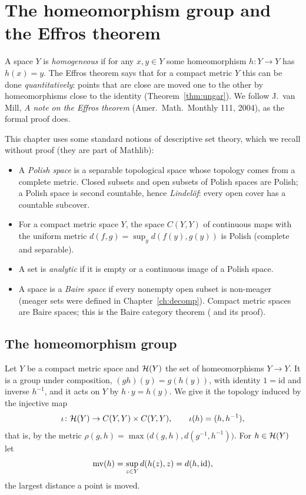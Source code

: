 \chapter{The homeomorphism group and the Effros theorem}\label{ch:effros}

A space $Y$ is \emph{homogeneous} if for any $x,y\in Y$ some homeomorphism $h\colon Y\to Y$ has
$h(x)=y$. The Effros theorem says that for a compact metric $Y$ this can be done
\emph{quantitatively}: points that are close are moved one to the other by homeomorphisms close to
the identity (Theorem~\ref{thm:ungar}). We follow J.~van Mill, \emph{A note on the Effros
theorem} (Amer.\ Math.\ Monthly 111, 2004), as the formal proof does.

This chapter uses some standard notions of descriptive set theory, which we recall without proof
(they are part of Mathlib):
\begin{itemize}
\item A \emph{Polish space} is a separable topological space whose topology comes from a complete
metric. Closed subsets and open subsets of Polish spaces are Polish; a Polish space is
second countable, hence \emph{Lindel\"of}: every open cover has a countable subcover.
\item For a compact metric space $Y$, the space $C(Y,Y)$ of continuous maps with the uniform metric
$d(f,g)=\sup_yd(f(y),g(y))$ is Polish (complete and separable).
\item A set is \emph{analytic} if it is empty or a continuous image of a Polish space.
\item A space is a \emph{Baire space} if every nonempty open subset is non-meager (meager sets were
defined in Chapter~\ref{ch:decomp}). Compact metric spaces are Baire spaces; this is the Baire
category theorem ( and its proof).
\end{itemize}

\section{The homeomorphism group}

Let $Y$ be a compact metric space and $\mathcal{H}(Y)$ the set of homeomorphisms $Y\to Y$. It is a group
under composition, $(gh)(y)=g(h(y))$, with identity $1=\mathrm{id}$ and inverse $h^{-1}$, and it acts on
$Y$ by $h\cdot y=h(y)$. We give it the topology induced by the injective map
\[
\iota\colon\mathcal{H}(Y)\to C(Y,Y)\times C(Y,Y),\qquad \iota(h)=(h,h^{-1}),
\]
that is, by the metric $\rho(g,h)=\max\bigl(d(g,h),d(g^{-1},h^{-1})\bigr)$. For $h\in\mathcal{H}(Y)$ let
\[
\operatorname{mv}(h)=\sup_{z\in Y}d(h(z),z)=d(h,\mathrm{id}),
\]
the largest distance a point is moved.

